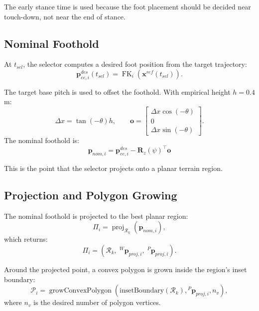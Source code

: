 \documentclass[11pt,a4paper]{article}
\newcommand{\proj}{\operatorname{proj}}
\begin{document}
The early stance time is used because the foot placement should be decided near touch-down, not near the end of stance.

\subsection{Nominal Foothold}

At $t_{sel}$, the selector computes a desired foot position from the target trajectory:
\begin{equation}
	\bm{p}_{ee,i}^{des}(t_{sel})
	=
	\operatorname{FK}_i(\bm{x}^{ref}(t_{sel})).
\end{equation}

The target base pitch is used to offset the foothold. With empirical height $h=0.4$ m:
\begin{equation}
	\Delta x
	=
	\tan(-\theta)h,
	\qquad
	\bm{o}
	=
	\begin{bmatrix}
		\Delta x\cos(-\theta)\\
		0\\
		\Delta x\sin(-\theta)
	\end{bmatrix}.
\end{equation}
The nominal foothold is:
\begin{equation}
	\boxed{
		\bm{p}_{nom,i}
		=
		\bm{p}_{ee,i}^{des}
		-
		\bm{R}_z(\psi)^{\top}\bm{o}
	}
\end{equation}

This is the point that the selector projects onto a planar terrain region.

\subsection{Projection and Polygon Growing}

The nominal foothold is projected to the best planar region:
\begin{equation}
	\Pi_i
	=
	\proj_{\mathcal{R}_k}(\bm{p}_{nom,i}),
\end{equation}
which returns:
\begin{equation}
	\Pi_i
	=
	\left(
		\mathcal{R}_k,\;
		{}^W\bm{p}_{proj,i},\;
		{}^P\bm{p}_{proj,i}
	\right).
\end{equation}

Around the projected point, a convex polygon is grown inside the region's inset boundary:
\begin{equation}
	\mathcal{P}_i
	=
	\operatorname{growConvexPolygon}
	\left(
		\text{insetBoundary}(\mathcal{R}_k),
		{}^P\bm{p}_{proj,i},
		n_v
	\right),
\end{equation}
where $n_v$ is the desired number of polygon vertices.
\end{document}
